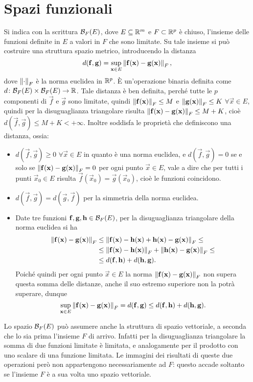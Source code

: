 \section{Spazi funzionali}
\label{sec:spazi-funz}
Si indica con la scrittura $\mathcal{B}_{F}({E})$, dove $E\subseteq\mathbb{R}^m$ e $F\subset\mathbb{R}^p$ è chiuso, l'insieme delle funzioni definite in $E$ a valori in $F$ che sono limitate. Su tale insieme si può costruire una struttura spazio metrico, introducendo la distanza
\[
d(\mathbf{f},\mathbf{g})=\sup_{\mathbf{x}\in E}\left\|{\mathbf{f}(\mathbf{x})-\mathbf{g}(\mathbf{x})}\right\|_F,
\]
dove $\left\|{\cdot}\right\|_F$ è la norma euclidea in $\mathbb{R}^p$. È un'operazione binaria definita come $d\colon\mathcal{B}_{F}({E})\times\mathcal{B}_{F}({E})\to\mathbb{R}$.
Tale distanza è ben definita, perché tutte le $p$ componenti di $\vec f$ e $\vec g$ sono limitate, quindi $\left\|{\mathbf{f}(\mathbf{x})}\right\|_F\leq M$ e $\left\|{\mathbf{g}(\mathbf{x})}\right\|_F\leq K$ $\forall\vec x\in E$, quindi per la disuguaglianza triangolare risulta $\left\|{\mathbf{f}(\mathbf{x})-\mathbf{g}(\mathbf{x})}\right\|_F\leq M+K$, cioè $d(\vec f,\vec g)\leq M+K<+\infty$.
Inoltre soddisfa le proprietà che definiscono una distanza, ossia:
\begin{itemize}
	\item $d(\vec f,\vec g)\ge 0$ $\forall\vec x\in E$ in quanto è una norma euclidea, e $d(\vec f,\vec g)=0$ se e solo se $\left\|{\mathbf{f}(\mathbf{x})-\mathbf{g}(\mathbf{x})}\right\|_F=0$ per ogni punto $\vec x\in E$, vale a dire che per tutti i punti $\vec x_0\in E$ risulta $\vec f(\vec x_0)=\vec g(\vec x_0)$, cioè le funzioni coincidono.
	\item $d(\vec f,\vec g)=d(\vec g,\vec f)$ per la simmetria della norma euclidea.
	\item Date tre funzioni $\mathbf{f},\mathbf{g},\mathbf{h}\in\mathcal{B}_{F}({E})$, per la disuguaglianza triangolare della norma euclidea si ha
	\begin{equation}
		\begin{split}
			\left\|{\mathbf{f}(\mathbf{x})-\mathbf{g}(\mathbf{x})}\right\|_F&\leq\left\|{\mathbf{f}(\mathbf{x})-\mathbf{h}(\mathbf{x})+\mathbf{h}(\mathbf{x})-\mathbf{g}(\mathbf{x})}\right\|_F\leq\\
			&\leq\left\|{\mathbf{f}(\mathbf{x})-\mathbf{h}(\mathbf{x})}\right\|_F+\left\|{\mathbf{h}(\mathbf{x})-\mathbf{g}(\mathbf{x})}\right\|_F\leq\\
			&\leq d(\mathbf{f},\mathbf{h})+d(\mathbf{h},\mathbf{g}).
		\end{split}
	\end{equation}
Poiché quindi per ogni punto $\vec x\in E$ la norma $\left\|{\mathbf{f}(\mathbf{x})-\mathbf{g}(\mathbf{x})}\right\|_F$ non supera questa somma delle distanze, anche il suo estremo superiore non la potrà superare, dunque
\[
\sup_{\mathbf{x}\in E}\left\|{\mathbf{f}(\mathbf{x})-\mathbf{g}(\mathbf{x})}\right\|_F=d(\mathbf{f},\mathbf{g})\leq d(\mathbf{f},\mathbf{h})+d(\mathbf{h},\mathbf{g}).
\]
\end{itemize}
Lo spazio $\mathcal{B}_{F}({E})$ può assumere anche la struttura di spazio vettoriale, a seconda che lo sia prima l'insieme $F$ di arrivo. Infatti per la disuguaglianza triangolare la somma di due funzioni limitate è limitata, e analogamente per il prodotto con uno scalare di una funzione limitata. Le immagini dei risultati di queste due operazioni però non appartengono necessariamente ad $F$: questo accade soltanto se l'insieme $F$ è a sua volta uno spazio vettoriale.

